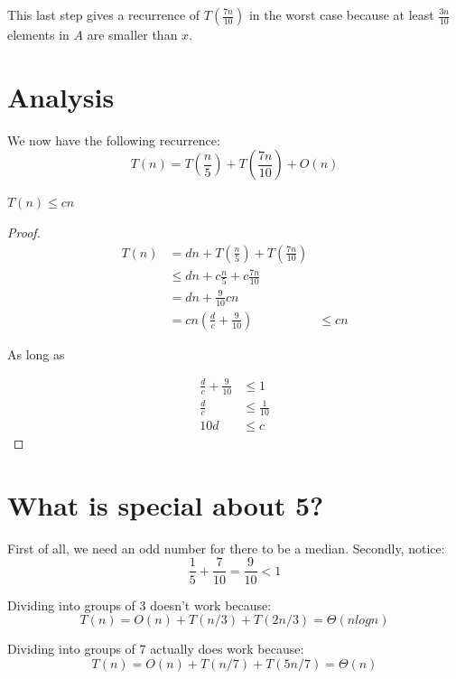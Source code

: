 This last step gives a recurrence of $ T \left( \frac{7n}{10} \right)
$ in the worst case because at least $ \frac{3n}{10} $ elements in $A$
are smaller than $x$.

\section{Analysis}

We now have the following recurrence:
%
\begin{displaymath}
T(n) = T \left( \frac{n}{5} \right) +T \left( \frac{7n}{10} \right) + O(n)
\end{displaymath}

\begin{claim}
$ T(n) \leq cn $
\end{claim}

\begin{proof}
\begin{align*}
T(n)
&= dn + T \left( \frac{n}{5} \right) +T \left( \frac{7n}{10} \right) \\
&\leq dn + c \frac{n}{5} + c \frac{7n}{10} \\
&= dn + \frac{9}{10}cn \\
&= cn \left( \frac{d}{c} + \frac{9}{10} \right)
&\leq cn
\end{align*}

As long as

\begin{align*}
\frac{d}{c} + \frac{9}{10} &\leq 1 \\
\frac{d}{c} &\leq \frac{1}{10} \\
10 d &\leq c
\end{align*}
\end{proof}

\section{What is special about 5?}

First of all, we need an odd number for there to be a median.
Secondly, notice:
%
\begin{displaymath}
\frac{1}{5} + \frac{7}{10} = \frac{9}{10} < 1
\end{displaymath}

Dividing into groups of 3 doesn't work because:
%
\begin{displaymath}
T(n) = O(n) + T(n/3) + T(2n/3) = \Theta(nlogn)
\end{displaymath}

Dividing into groups of 7 actually does work because:
%
\begin{displaymath}
T(n) = O(n) + T(n/7) + T(5n/7) = \Theta(n)
\end{displaymath}
